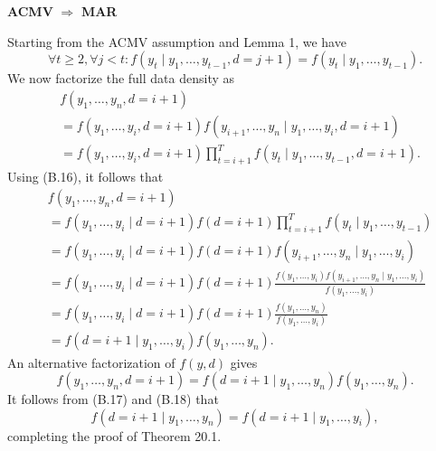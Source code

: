 \documentclass[UTF8,a4paper,10pt]{article}
\begin{document}
\textbf{ACMV} $\Rightarrow$ \textbf{MAR}

Starting from the ACMV assumption and Lemma 1, we have
\[
\forall t \geq 2, \forall j < t : f(y_t\mid y_1,\ldots,y_{t-1}, d = j + 1) = f(y_t\mid y_1,\ldots,y_{t-1}). \tag*{(B.16)}
\]
We now factorize the full data density as
\begin{align*}
    &f(y_1,\ldots,y_n, d = i + 1) \\
    &= f(y_1,\ldots,y_i, d = i + 1)f(y_{i+1},\ldots,y_n\mid y_1,\ldots,y_i, d = i + 1) \\
    &= f(y_1,\ldots,y_i, d = i + 1) \prod_{t=i+1}^{T} f(y_t\mid y_1,\ldots,y_{t-1}, d = i + 1).
\end{align*}
Using (B.16), it follows that
\begin{align*}
    &f(y_1,\ldots,y_n, d = i + 1) \\
    &= f(y_1,\ldots,y_i\mid d = i + 1)f(d = i + 1) \prod_{t=i+1}^{T} f(y_t\mid y_1,\ldots,y_{t-1}) \\
    &= f(y_1,\ldots,y_i\mid d = i + 1)f(d = i + 1)f(y_{i+1},\ldots,y_n\mid y_1,\ldots,y_i) \\
    &= f(y_1,\ldots,y_i\mid d = i + 1)f(d = i + 1) \frac{f(y_1,\ldots,y_i)f(y_{i+1},\ldots,y_n\mid y_1,\ldots,y_i)}{f(y_1,\ldots,y_i)} \\
    &= f(y_1,\ldots,y_i\mid d = i + 1)f(d = i + 1) \frac{f(y_1,\ldots,y_n)}{f(y_1,\ldots,y_i)} \\
    &= f(d = i + 1\mid y_1,\ldots,y_i)f(y_1,\ldots,y_n). \tag*{(B.17)}
\end{align*}
An alternative factorization of \(f(y, d)\) gives
\[
f(y_1,\ldots,y_n, d = i + 1) = f(d = i + 1\mid y_1,\ldots,y_n)f(y_1,\ldots,y_n). \tag*{(B.18)}
\]
It follows from (B.17) and (B.18) that
\[
f(d = i + 1\mid y_1,\ldots,y_n) = f(d = i + 1\mid y_1,\ldots,y_i),
\]
completing the proof of Theorem 20.1.
\end{document}
